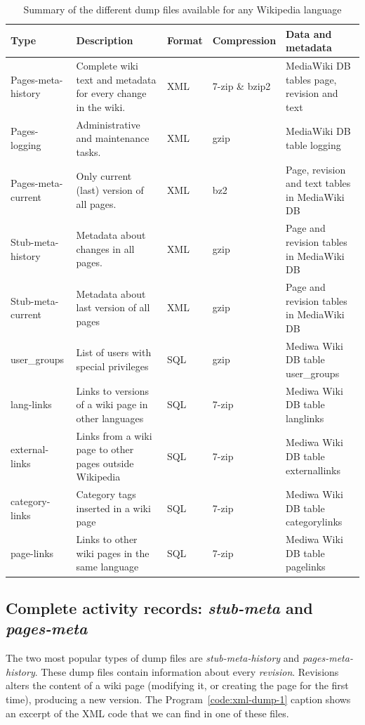 \begin{longtable}[l]{|l|m{4cm}|l|l|m{3cm}|}
 \caption[Types of dump files]
  {Summary of the different dump files available for any Wikipedia language}
  \label{tab:dumps-list}\\
  \hline
  {\bfseries Type} & {\bfseries Description} & {\bfseries Format} & {\bfseries Compression} & 
  {\bfseries Data and metadata}\\
  \hline
   Pages-meta-history & Complete wiki text and metadata for every change in the wiki. & XML &
   7-zip \& bzip2 & MediaWiki DB tables page, revision and text\\
  \hline
   Pages-logging & Administrative and maintenance tasks. & XML & gzip & MediaWiki DB table logging\\
  \hline
   Pages-meta-current & Only current (last) version of all pages. & XML & bz2 & Page, revision and text tables in MediaWiki DB\\
  \hline
   Stub-meta-history & Metadata about changes in all pages. & XML & gzip & Page and revision tables in MediaWiki DB\\
  \hline
   Stub-meta-current & Metadata about last version of all pages & XML & gzip & Page and revision tables in MediaWiki DB\\
  \hline
   user\_groups & List of users with special privileges & SQL & gzip & Mediwa Wiki DB table user\_groups\\
  \hline
   lang-links & Links to versions of a wiki page in other languages & SQL & 7-zip & Mediwa Wiki DB table langlinks\\
  \hline
   external-links & Links from a wiki page to other pages outside Wikipedia & SQL & 7-zip & Mediwa Wiki DB table externallinks\\
  \hline
   category-links & Category tags inserted in a wiki page& SQL & 7-zip & Mediwa Wiki DB table categorylinks\\
  \hline
   page-links & Links to other wiki pages in the same language & SQL & 7-zip & Mediwa Wiki DB table pagelinks\\
  \hline
\end{longtable}


\subsection{Complete activity records: \textit{stub-meta} and \textit{pages-meta}}
The two most popular types of dump files are \textit{stub-meta-history} and
\textit{pages-meta-history}. These dump files contain information about every
\textit{revision}. Revisions alters the content of a wiki page (modifying it, or
creating the page for the first time), producing a new version. 
The Program~\ref{code:xml-dump-1} caption shows an excerpt of the XML code 
that we can find in one of these files.

